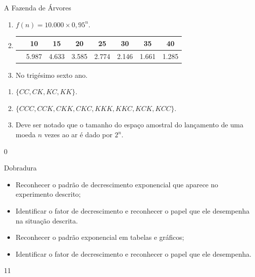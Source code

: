 \begin{answer}{A Fazenda de Árvores}
{

	\begin{enumerate}

	\item{}
	$f(n)=10.000 \times 0,95^{n}$.

	\item{}
	{
	\begin{tabu} to 
	\hline
	 & 10 & 15 & 20 & 25 & 30 & 35 & 40 \\
	\hline
	 & 5.987 & 4.633 & 3.585 & 2.774 & 2.146 & 1.661 & 1.285 \\
	\hline
	\end{tabu}
	}

	\item{}
	No trigésimo sexto ano.

	\end{enumerate}

	\begin{enumerate}

	\item{}
	$\{CC, CK, KC, KK\}$.

	\item{}
	$\{CCC, CCK, CKK, CKC, KKK, KKC, KCK, KCC\}$.

	\item{}
	Deve ser notado que o tamanho do espaço amostral do lançamento de uma moeda $n$ vezes ao ar é dado por $2^{n}$.

	\end{enumerate}
}{0}
\end{answer}
\begin{objectives}{Dobradura}
{
	\begin{itemize}
	\item Reconhecer o padrão de decrescimento exponencial que aparece no experimento descrito;
	\item Identificar o fator de decrescimento e reconhecer o papel que ele desempenha na situação descrita.

	\end{itemize}


	\begin{itemize}
	\item Reconhecer o padrão exponencial em tabelas e gráficos;
	\item Identificar o fator de decrescimento e reconhecer o papel que ele desempenha.
	\end{itemize}
}{1}{1}

\end{objectives}

